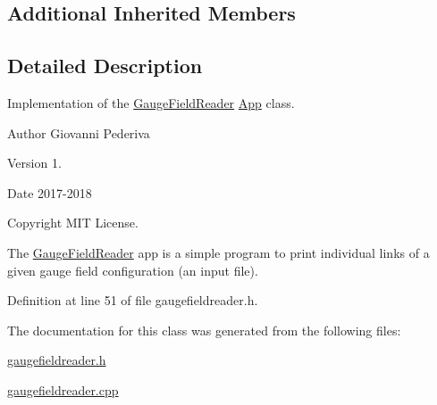 \subsection*{Additional Inherited Members}


\subsection{Detailed Description}
Implementation of the \hyperlink{classGaugeFieldReader}{Gauge\+Field\+Reader} \hyperlink{classApp}{App} class. 

\begin{DoxyAuthor}{Author}
Giovanni Pederiva 
\end{DoxyAuthor}
\begin{DoxyVersion}{Version}
1. 
\end{DoxyVersion}
\begin{DoxyDate}{Date}
2017-\/2018 
\end{DoxyDate}
\begin{DoxyCopyright}{Copyright}
M\+IT License.
\end{DoxyCopyright}
The \hyperlink{classGaugeFieldReader}{Gauge\+Field\+Reader} app is a simple program to print individual links of a given gauge field configuration (an input file). 

Definition at line 51 of file gaugefieldreader.\+h.



The documentation for this class was generated from the following files\+:\begin{DoxyCompactItemize}
\item 
\hyperlink{gaugefieldreader_8h}{gaugefieldreader.\+h}\item 
\hyperlink{gaugefieldreader_8cpp}{gaugefieldreader.\+cpp}\end{DoxyCompactItemize}
